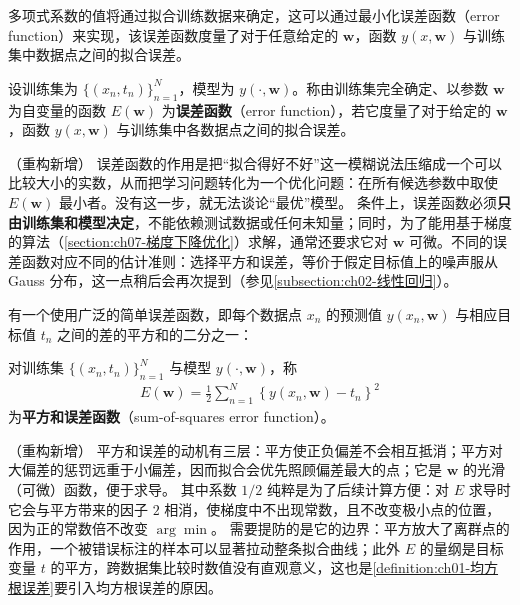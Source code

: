 \documentclass[../../main.tex]{subfiles}
\begin{document}
多项式系数的值将通过拟合训练数据来确定，这可以通过最小化误差函数（error function）来实现，该误差函数度量了对于任意给定的 $\mathbf{w}$，函数 $y(x,\mathbf{w})$ 与训练集中数据点之间的拟合误差。

\begin{definition}[误差函数]\label{definition:ch01-误差函数}
设训练集为 $\{(x_n,t_n)\}_{n=1}^{N}$，模型为 $y(\cdot,\mathbf{w})$。称由训练集完全确定、以参数 $\mathbf{w}$ 为自变量的函数 $E(\mathbf{w})$ 为\textbf{误差函数}（error function），若它度量了对于给定的 $\mathbf{w}$，函数 $y(x,\mathbf{w})$ 与训练集中各数据点之间的拟合误差。
\end{definition}

\begin{remark}（重构新增）
误差函数的作用是把“拟合得好不好”这一模糊说法压缩成一个可以比较大小的实数，从而把学习问题转化为一个优化问题：在所有候选参数中取使 $E(\mathbf{w})$ 最小者。没有这一步，就无法谈论“最优”模型。
条件上，误差函数必须\textbf{只由训练集和模型决定}，不能依赖测试数据或任何未知量；同时，为了能用基于梯度的算法（\cref{section:ch07-梯度下降优化}）求解，通常还要求它对 $\mathbf{w}$ 可微。不同的误差函数对应不同的估计准则：选择平方和误差，等价于假定目标值上的噪声服从 Gauss 分布，这一点稍后会再次提到（参见\cref{subsection:ch02-线性回归}）。
\end{remark}

有一个使用广泛的简单误差函数，即每个数据点 $x_n$ 的预测值 $y(x_n,\mathbf{w})$ 与相应目标值 $t_n$ 之间的差的平方和的二分之一：

\begin{definition}[平方和误差函数]\label{definition:ch01-平方和误差函数}
对训练集 $\{(x_n,t_n)\}_{n=1}^{N}$ 与模型 $y(\cdot,\mathbf{w})$，称
\begin{align}
  E(\mathbf{w}) = \frac{1}{2} \sum_{n=1}^{N} \left\{ y(x_n, \mathbf{w}) - t_n \right\}^2
  \label{align:ch01-平方和误差}
\end{align}
为\textbf{平方和误差函数}（sum-of-squares error function）。
\end{definition}

\begin{remark}（重构新增）
平方和误差的动机有三层：平方使正负偏差不会相互抵消；平方对大偏差的惩罚远重于小偏差，因而拟合会优先照顾偏差最大的点；它是 $\mathbf{w}$ 的光滑（可微）函数，便于求导。
其中系数 $1/2$ 纯粹是为了后续计算方便：对 $E$ 求导时它会与平方带来的因子 $2$ 相消，使梯度中不出现常数，且不改变极小点的位置，因为正的常数倍不改变 $\arg\min$。
需要提防的是它的边界：平方放大了离群点的作用，一个被错误标注的样本可以显著拉动整条拟合曲线；此外 $E$ 的量纲是目标变量 $t$ 的平方，跨数据集比较时数值没有直观意义，这也是\cref{definition:ch01-均方根误差}要引入均方根误差的原因。
\end{remark}
\end{document}

